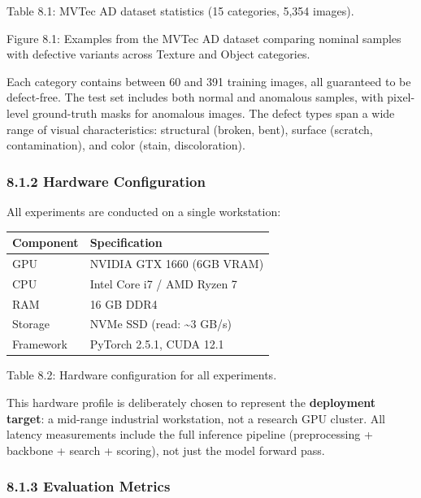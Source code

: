 Table 8.1: MVTec AD dataset statistics (15 categories, 5,354 images).

Figure 8.1: Examples from the MVTec AD dataset comparing nominal samples with defective variants across Texture and Object categories.

Each category contains between 60 and 391 training images, all guaranteed to be defect-free. The test set includes both normal and anomalous samples, with pixel-level ground-truth masks for anomalous images. The defect types span a wide range of visual characteristics: structural (broken, bent), surface (scratch, contamination), and color (stain, discoloration).

\subsubsection{8.1.2 Hardware Configuration}\label{hardware-configuration}

All experiments are conducted on a single workstation:

\begin{longtable}[]{@{}ll@{}}
\toprule\noalign{}
Component & Specification \\
\midrule\noalign{}
\endhead
\bottomrule\noalign{}
\endlastfoot
GPU & NVIDIA GTX 1660 (6GB VRAM) \\
CPU & Intel Core i7 / AMD Ryzen 7 \\
RAM & 16 GB DDR4 \\
Storage & NVMe SSD (read: \textasciitilde3 GB/s) \\
Framework & PyTorch 2.5.1, CUDA 12.1 \\
\end{longtable}

Table 8.2: Hardware configuration for all experiments.

This hardware profile is deliberately chosen to represent the \textbf{deployment target}: a mid-range industrial workstation, not a research GPU cluster. All latency measurements include the full inference pipeline (preprocessing + backbone + search + scoring), not just the model forward pass.

\subsubsection{8.1.3 Evaluation Metrics}\label{evaluation-metrics}

